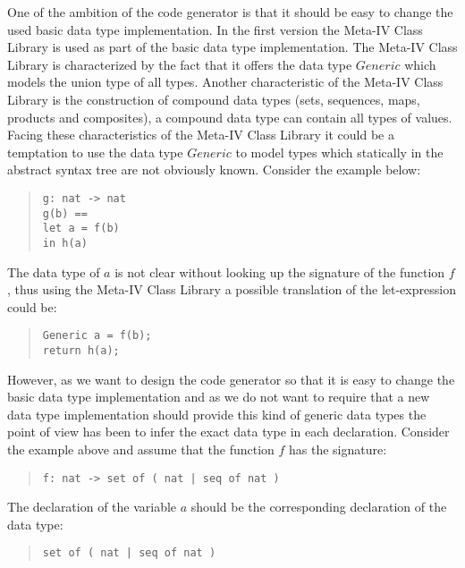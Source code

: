 \documentclass[a4paper,dvips]{article}
\newcommand{\MCL}{Meta-IV Class Library}
\begin{document}
One of the ambition of the code generator is that it should be easy to
change the used basic data type implementation. In the first version
the \MCL{} is used as part of the basic data type implementation. The
\MCL{} is characterized by the fact that it offers the data type
$Generic$ which models the union type of all types. Another
characteristic of the \MCL{} is the construction of compound data
types (sets, sequences, maps, products and composites), a compound
data type can contain all types of values.  Facing these
characteristics of the \MCL{} it could be a temptation to use the data
type $Generic$ to model types which statically in the abstract
syntax tree are not obviously known. Consider the example below:

\begin{quote}
\begin{verbatim}
g: nat -> nat
g(b) ==
let a = f(b)
in h(a)
\end{verbatim}
\end{quote}

The data type of $a$ is not clear without looking up the signature
of the function $f$, thus using the \MCL{} a possible translation of
the let-expression could be:

\begin{quote}
\begin{verbatim}
Generic a = f(b);
return h(a);
\end{verbatim}
\end{quote}

However, as we want to design the code generator so that it is easy to
change the basic data type implementation and as we do not want to
require that a new data type implementation should provide this kind
of generic data types the point of view has been to infer the exact
data type in each declaration.  Consider the example above and assume
that the function $f$ has the signature:

\begin{quote}
\begin{verbatim}
f: nat -> set of ( nat | seq of nat )
\end{verbatim}
\end{quote}

The declaration of the variable $a$ should be the corresponding
declaration of the data type:

\begin{quote}
\begin{verbatim}
set of ( nat | seq of nat ) 
\end{verbatim}
\end{quote}
\end{document}
